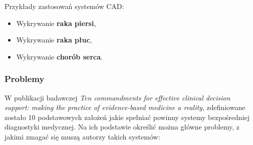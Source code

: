 Przykłady zastosowań systemów CAD:
\begin{itemize}
	\item Wykrywanie \textbf{raka piersi},
	\item Wykrywanie \textbf{raka płuc},
	\item Wykrywanie \textbf{chorób serca}.
\end{itemize}

\subsubsection{Problemy}

W publikacji badawczej \textit{Ten commandments for effective clinical decision support: making the practice of evidence-based medicine a reality}, zdefiniowane zostało 10 podstawowych założeń jakie spełniać powinny systemy bezpośredniej diagnostyki medycznej. Na ich podstawie określić można główne problemy, z jakimi zmagać się muszą autorzy takich systemów:

